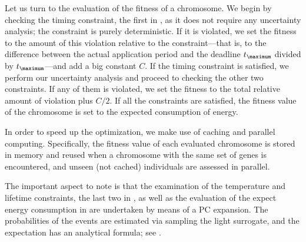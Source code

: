 Let us turn to the evaluation of the fitness of a chromosome. We begin by
checking the timing constraint, the first in
, as it does not require any uncertainty
analysis; the constraint is purely deterministic. If it is violated, we set the
fitness to the amount of this violation relative to the constraint---that is, to
the difference between the actual application period and the deadline
$t_\maximum$ divided by $t_\maximum$---and add a big constant $C$. If the timing
constraint is satisfied, we perform our uncertainty analysis and proceed to
checking the other two constraints. If any of them is violated, we set the
fitness to the total relative amount of violation plus $C / 2$. If all the
constraints are satisfied, the fitness value of the chromosome is set to the
expected consumption of energy.

In order to speed up the optimization, we make use of caching and parallel
computing. Specifically, the fitness value of each evaluated chromosome is
stored in memory and reused when a chromosome with the same set of genes is
encountered, and unseen (not cached) individuals are assessed in parallel.

The important aspect to note is that the examination of the temperature and
lifetime constraints, the last two in , as
well as the evaluation of the expect energy consumption in
 are undertaken by means of a \ac{PC}
expansion. The probabilities of the events are estimated via sampling the light
surrogate, and the expectation has an analytical formula; see
.

